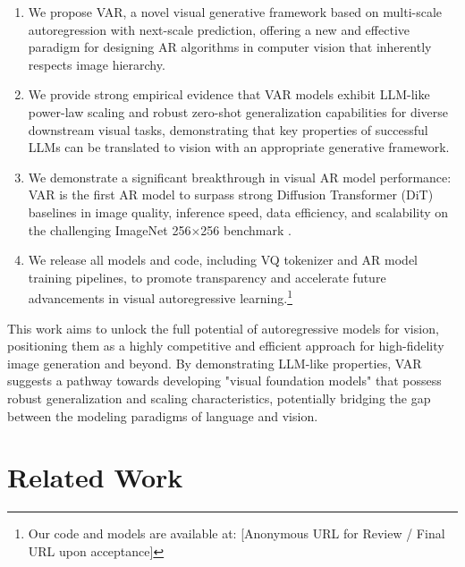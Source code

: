 \documentclass{article}
\begin{document}
\begin{enumerate}[leftmargin=*,itemsep=2pt,topsep=3pt]
    \item We propose VAR, a novel visual generative framework based on multi-scale autoregression with next-scale prediction, offering a new and effective paradigm for designing AR algorithms in computer vision that inherently respects image hierarchy.
    \item We provide strong empirical evidence that VAR models exhibit LLM-like power-law scaling and robust zero-shot generalization capabilities for diverse downstream visual tasks, demonstrating that key properties of successful LLMs can be translated to vision with an appropriate generative framework.
    \item We demonstrate a significant breakthrough in visual AR model performance: VAR is the first AR model to surpass strong Diffusion Transformer (DiT) baselines \cite{peebles2023scalable} in image quality, inference speed, data efficiency, and scalability on the challenging ImageNet 256$\times$256 benchmark \cite{deng2009imagenet}.
    \item We release all models and code, including VQ tokenizer and AR model training pipelines, to promote transparency and accelerate future advancements in visual autoregressive learning.\footnote{Our code and models are available at: [Anonymous URL for Review / Final URL upon acceptance]}
\end{enumerate}

This work aims to unlock the full potential of autoregressive models for vision, positioning them as a highly competitive and efficient approach for high-fidelity image generation and beyond. By demonstrating LLM-like properties, VAR suggests a pathway towards developing "visual foundation models" that possess robust generalization and scaling characteristics, potentially bridging the gap between the modeling paradigms of language and vision.

\section{Related Work}
\label{sec:related_work}
\end{document}
